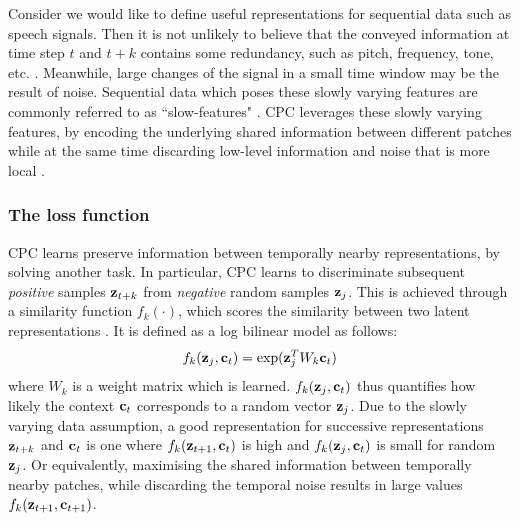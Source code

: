	Consider we would like to define useful representations for sequential data such as speech signals. Then it is not unlikely to believe that the conveyed information at time step $t$ and $t+k$ contains some redundancy, such as pitch, frequency, tone, etc. \citep{raoUnderstandingGradientIsolatedLearning2020}. Meanwhile, large changes of the signal in a small time window may be the result of noise. Sequential data which poses these slowly varying features are commonly referred to as ``slow-features" \citep{zhangSlowFeatureAnalysis2012}. CPC leverages these slowly varying features, by encoding the underlying shared information between different patches while at the same time discarding low-level information and noise that is more local \citep{oordRepresentationLearningContrastive2019}.


\subsubsection{The loss function}
	
	
	CPC learns preserve information between temporally nearby representations, by solving another task. In particular, CPC learns to discriminate subsequent \textit{positive} samples $\mathbf{z}_{t+k}$ from \textit{negative} random samples $\mathbf{z}_j$. This is achieved through a similarity function $f_k(\cdot)$, which scores the similarity between two latent representations \citep{lowePuttingEndEndtoEnd2020a}. It is defined as a log bilinear model as follows:
	\begin{equation} %
		\fkdefinition \label{eq:fk}
	\end{equation}
	where $W_k$ is a weight matrix which is learned. $f_k( \mathbf{z}_j , \mathbf{c}_t )$ thus quantifies how likely the context $\mathbf{c}_t$ corresponds to a random vector $\mathbf{z}_j$. Due to the slowly varying data assumption, a good representation for successive representations $\mathbf{z}_{t+k}$ and $\mathbf{c}_t$ is one where $f_k( \mathbf{z}_{t+1}, \mathbf{c}_t)$ is high and $f_k( \mathbf{z}_j, \mathbf{c}_t)$ is small for random $\mathbf{z}_j$. Or equivalently, maximising the shared information between temporally nearby patches, while discarding the temporal noise results in large values $f_k( \mathbf{z}_{t+1}, \mathbf{c}_{t+1})$.
	
